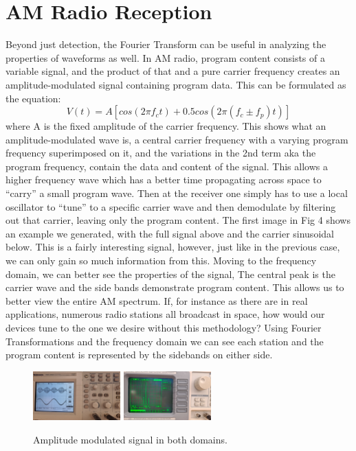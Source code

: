 \documentclass[prl,twocolumn,superscriptaddress,floatfix]{revtex4}
\begin{document}
\section{AM Radio Reception}

Beyond just detection, the Fourier Transform can be useful in analyzing the properties of waveforms as well.
In AM radio, program content consists of a variable signal, and the product of that and a pure carrier frequency creates an amplitude-modulated signal containing program data.
This can be formulated as the equation:
\begin{equation}
    V(t) = A[cos(2\pi f_{c}t)+0.5cos(2\pi(f_{c} \pm f_{p})t)]
\end{equation}
where A is the fixed amplitude of the carrier frequency.
This shows what an amplitude-modulated wave is, a central carrier frequency with a varying program frequency superimposed on it, and the variations in the 2nd term aka the program frequency, contain the data and content of the signal.
This allows a higher frequency wave which has a better time propagating across space to ``carry'' a small program wave.
Then at the receiver one simply has to use a local oscillator to ``tune'' to a specific carrier wave and then demodulate by filtering out that carrier, leaving only the program content.
The first image in Fig 4 shows an example we generated, with the full signal above and the carrier sinusoidal below.
This is a fairly interesting signal, however, just like in the previous case, we can only gain so much information from this.
Moving to the frequency domain, we can better see the properties of the signal, The central peak is the carrier wave and the side bands demonstrate program content.
This allows us to better view the entire AM spectrum. If, for instance as there are in real applications, numerous radio stations all broadcast in space, how would our devices tune to the one we desire without this methodology?
Using Fourier Transformations and the frequency domain we can see each station and the program content is represented by the sidebands on either side. 

\begin{figure}[H]
\begin{center}
\includegraphics[width = 0.3\textwidth]{AM data, Time.jpg}
\includegraphics[width = 0.3\textwidth]{AM data, Freq.jpg}
\label{amsignal}
\caption{Amplitude modulated signal in both domains.}
\end{center}
\end{figure}
\end{document}
